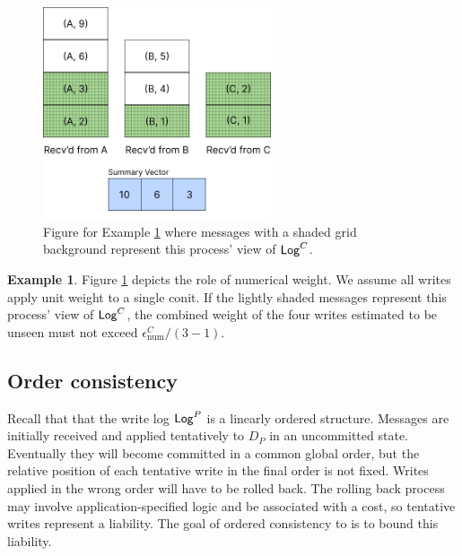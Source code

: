 \documentclass[]             %
{NASA}                       %
\theoremstyle{definition}
\newtheorem{example}[theorem]{Example}
\begin{document}
\begin{figure}
  \centering
  \includegraphics[width=0.6\textwidth]{images/conit/Numerical1.png}
  \caption{Figure for Example \ref{ex:conit-numerical} where
    messages with a shaded grid background represent this process' view of $\mathsf{Log}^{C}$.}
  \label{fig:conit-numerical}
\end{figure}

\begin{example}
  \label{ex:conit-numerical}
  Figure \ref{fig:conit-numerical} depicts the role of numerical
  weight. We assume all writes apply unit weight to a single conit. If
  the lightly shaded messages represent this process' view of
  $\mathsf{Log}^{C}$, the combined weight of the four writes estimated to be
  unseen must not exceed
  \mbox{$\epsilon^C_\textrm{num} / \left(3 - 1\right)$}.
\end{example}

\subsection{Order consistency}
\label{ssec:conit-order-consistency}
Recall that that the write log $\mathsf{Log}^{P}$ is a linearly ordered
structure. Messages are initially received and applied tentatively to
$D_P$ in an uncommitted state. Eventually they will become committed
in a common global order, but the relative position of each tentative
write in the final order is not fixed. Writes applied in the wrong
order will have to be rolled back. The rolling back process may
involve application-specified logic and be associated with a cost, so
tentative writes represent a liability. The goal of ordered
consistency to is to bound this liability.
\end{document}
